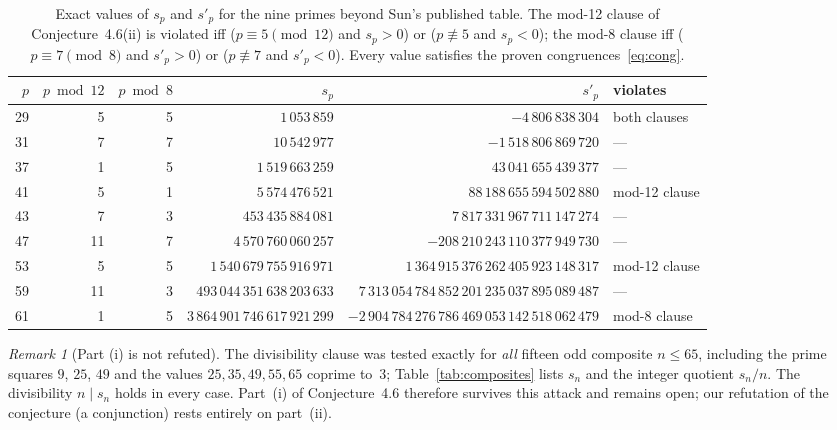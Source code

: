 \documentclass[10pt]{article}
\theoremstyle{remark}
\newtheorem{remark}[theorem]{Remark}
\begin{document}
\begin{table}[ht]
\centering\footnotesize
\setlength{\tabcolsep}{3.5pt}
\begin{tabular}{@{}rrrrrl@{}}
\toprule
$p$ & $p\bmod{12}$ & $p\bmod 8$ & $s_p$ & $s'_p$ & violates \\
\midrule
29 & 5 & 5 & $1\,053\,859$ & $-4\,806\,838\,304$ & both clauses \\
31 & 7 & 7 & $10\,542\,977$ & $-1\,518\,806\,869\,720$ & --- \\
37 & 1 & 5 & $1\,519\,663\,259$ & $43\,041\,655\,439\,377$ & --- \\
41 & 5 & 1 & $5\,574\,476\,521$ & $88\,188\,655\,594\,502\,880$ & mod-12 clause \\
43 & 7 & 3 & $453\,435\,884\,081$ & $7\,817\,331\,967\,711\,147\,274$ & --- \\
47 & 11 & 7 & $4\,570\,760\,060\,257$ & $-208\,210\,243\,110\,377\,949\,730$ & --- \\
53 & 5 & 5 & $1\,540\,679\,755\,916\,971$ & $1\,364\,915\,376\,262\,405\,923\,148\,317$ & mod-12 clause \\
59 & 11 & 3 & $493\,044\,351\,638\,203\,633$ & $7\,313\,054\,784\,852\,201\,235\,037\,895\,089\,487$ & --- \\
61 & 1 & 5 & $3\,864\,901\,746\,617\,921\,299$ & $-2\,904\,784\,276\,786\,469\,053\,142\,518\,062\,479$ & mod-8 clause \\
\bottomrule
\end{tabular}
\caption{Exact values of $s_p$ and $s'_p$ for the nine primes beyond Sun's
published table. The mod-12 clause of Conjecture~4.6(ii) is violated iff
($p\equiv 5\pmod{12}$ and $s_p>0$) or ($p\not\equiv 5$ and $s_p<0$); the
mod-8 clause iff ($p\equiv 7\pmod 8$ and $s'_p>0$) or ($p\not\equiv 7$ and
$s'_p<0$). Every value satisfies the proven
congruences~\eqref{eq:cong}.}
\label{tab:primes}
\end{table}

\begin{remark}[Part (i) is not refuted]\label{rem:parti}
The divisibility clause was tested exactly for \emph{all} fifteen odd
composite $n\le 65$, including the prime squares $9$, $25$, $49$ and the
values $25,35,49,55,65$ coprime to~$3$; Table~\ref{tab:composites} lists $s_n$ and
the integer quotient $s_n/n$. The divisibility $n\mid s_n$ holds in every
case. Part~(i) of Conjecture~4.6 therefore survives this attack and remains
open; our refutation of the conjecture (a conjunction) rests entirely on
part~(ii).
\end{remark}
\end{document}

